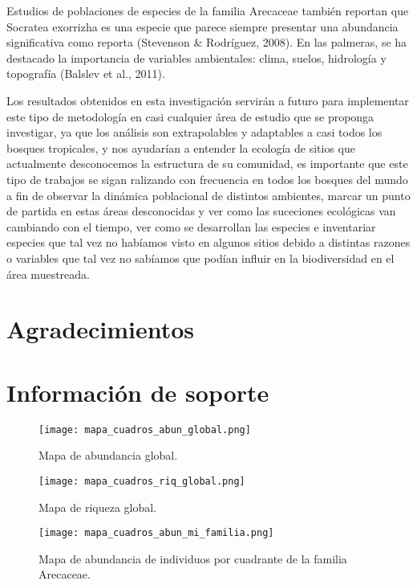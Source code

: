 \documentclass[11pt,]{article}
\newcommand{\beginsupplement}{ \setcounter{table}{0} \renewcommand{\thetable}{S\arabic{table}} \setcounter{figure}{0} \renewcommand{\thefigure}{S\arabic{figure}} }
\begin{document}
Estudios de poblaciones de especies de la familia Arecaceae también
reportan que Socratea exorrizha es una especie que parece siempre
presentar una abundancia significativa como reporta (Stevenson \&
Rodríguez, 2008). En las palmeras, se ha destacado la importancia de
variables ambientales: clima, suelos, hidrología y topografía (Balslev
et al., 2011).

Los resultados obtenidos en esta investigación servirán a futuro para
implementar este tipo de metodología en casi cualquier área de estudio
que se proponga investigar, ya que los análisis son extrapolables y
adaptables a casi todos los bosques tropicales, y nos ayudarían a
entender la ecología de sitios que actualmente desconocemos la
estructura de su comunidad, es importante que este tipo de trabajos se
sigan ralizando con frecuencia en todos los bosques del mundo a fin de
observar la dinámica poblacional de distintos ambientes, marcar un punto
de partida en estas áreas desconocidas y ver como las suceciones
ecológicas van cambiando con el tiempo, ver como se desarrollan las
especies e inventariar especies que tal vez no habíamos visto en algunos
sitios debido a distintas razones o variables que tal vez no sabíamos
que podían influir en la biodiversidad en el área muestreada.

\section{Agradecimientos}\label{agradecimientos}

\section{Información de soporte}\label{informaciuxf3n-de-soporte}

\beginsupplement

\begin{figure}
\centering
\texttt{[image: mapa\_cuadros\_abun\_global.png]}
\caption{Mapa de abundancia global.
\label{fig:mapa_cuadros_abun_global}}
\end{figure}

\begin{figure}
\centering
\texttt{[image: mapa\_cuadros\_riq\_global.png]}
\caption{Mapa de riqueza global. \label{fig:mapa_cuadros_riq_global}}
\end{figure}

\begin{figure}
\centering
\texttt{[image: mapa\_cuadros\_abun\_mi\_familia.png]}
\caption{Mapa de abundancia de individuos por cuadrante de la familia
Arecaceae. \label{fig:mapa_cuadros_abun_mi_familia}}
\end{figure}
\end{document}
